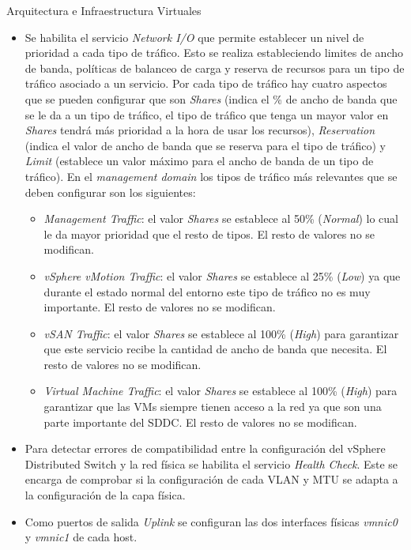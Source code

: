 \begin{subsection}{Arquitectura e Infraestructura Virtuales\cite{CFVirtInfraes}}
\begin{itemize}
    \item Se habilita el servicio \textit{Network I/O} que permite establecer un nivel de prioridad a cada tipo de tráfico. Esto se realiza estableciendo limites de ancho de banda, políticas de balanceo de carga y reserva de recursos para un tipo de tráfico asociado a un servicio. Por cada tipo de tráfico hay cuatro aspectos que se pueden configurar que son \textit{Shares} (indica el \% de ancho de banda que se le da a un tipo de tráfico, el tipo de tráfico que tenga un mayor valor en \textit{Shares} tendrá más prioridad a la hora de usar los recursos), \textit{Reservation} (indica el valor de ancho de banda que se reserva para el tipo de tráfico) y \textit{Limit} (establece un valor máximo para el ancho de banda de un tipo de tráfico). En el \textit{management domain} los tipos de tráfico más relevantes que se deben configurar son los siguientes:
    \begin{itemize}
      \item \textit{Management Traffic}: el valor \textit{Shares} se establece al 50\% (\textit{Normal}) lo cual le da mayor prioridad que el resto de tipos. El resto de valores no se modifican.
      \item \textit{vSphere vMotion Traffic}: el valor \textit{Shares} se establece al 25\% (\textit{Low}) ya que durante el estado normal del entorno este tipo de tráfico no es muy importante. El resto de valores no se modifican.
      \item \textit{vSAN Traffic}: el valor \textit{Shares} se establece al 100\% (\textit{High}) para garantizar que este servicio recibe la cantidad de ancho de banda que necesita. El resto de valores no se modifican.
      \item \textit{Virtual Machine Traffic}: el valor \textit{Shares} se establece al 100\% (\textit{High}) para garantizar que las VMs siempre tienen acceso a la red ya que son una parte importante del SDDC. El resto de valores no se modifican.
    \end{itemize}
    
    \item Para detectar errores de compatibilidad entre la configuración del vSphere Distributed Switch y la red física se habilita el servicio \textit{Health Check}. Este se encarga de comprobar si la configuración de cada VLAN y MTU se adapta a la configuración de la capa física.
    
    \item Como puertos de salida \textit{Uplink} se configuran las dos interfaces físicas \textit{vmnic0} y \textit{vmnic1} de cada host.
    

\end{itemize}
\end{subsection}

